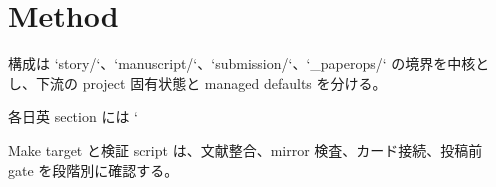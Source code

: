 \section{Method}

構成は `story/`、`manuscript/`、`submission/`、`_paperops/` の境界を中核とし、下流の project 固有状態と managed defaults を分ける。

各日英 section には `%

Make target と検証 script は、文献整合、mirror 検査、カード接続、投稿前 gate を段階別に確認する。
